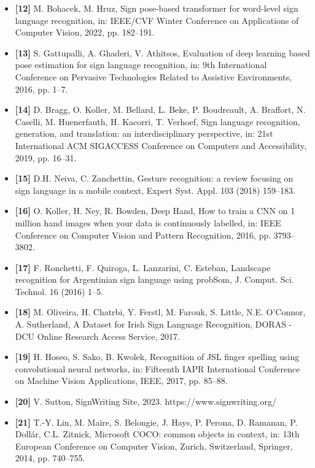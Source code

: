 \documentclass[12pt, a4paper]{article}
\begin{document}
\begin{itemize}[label=]
    \item \textbf{[12]} M. Bohacek, M. Hruz, Sign pose-based transformer for word-level sign language recognition, in: IEEE/CVF Winter Conference on Applications of Computer Vision, 2022, pp. 182–191.
    \item \textbf{[13]} S. Gattupalli, A. Ghaderi, V. Athitsos, Evaluation of deep learning based pose estimation for sign language recognition, in: 9th International Conference on Pervasive Technologies Related to Assistive Environments, 2016, pp. 1–7.
    \item \textbf{[14]} D. Bragg, O. Koller, M. Bellard, L. Beke, P. Boudreault, A. Braffort, N. Caselli, M. Huenerfauth, H. Kacorri, T. Verhoef, Sign language recognition, generation, and translation: an interdisciplinary perspective, in: 21st International ACM SIGACCESS Conference on Computers and Accessibility, 2019, pp. 16–31.
    \item \textbf{[15]} D.H. Neiva, C. Zanchettin, Gesture recognition: a review focusing on sign language in a mobile context, Expert Syst. Appl. 103 (2018) 159–183.
    \item \textbf{[16]} O. Koller, H. Ney, R. Bowden, Deep Hand, How to train a CNN on 1 million hand images when your data is continuously labelled, in: IEEE Conference on Computer Vision and Pattern Recognition, 2016, pp. 3793–3802.
    \item \textbf{[17]} F. Ronchetti, F. Quiroga, L. Lanzarini, C. Esteban, Landscape recognition for Argentinian sign language using probSom, J. Comput. Sci. Technol. 16 (2016) 1–5.
    \item \textbf{[18]} M. Oliveira, H. Chatrbi, Y. Ferstl, M. Farouk, S. Little, N.E. O’Connor, A. Sutherland, A Dataset for Irish Sign Language Recognition, DORAS - DCU Online Research Access Service, 2017.
    \item \textbf{[19]} H. Hoseo, S. Sako, B. Kwolek, Recognition of JSL finger spelling using convolutional neural networks, in: Fifteenth IAPR International Conference on Machine Vision Applications, IEEE, 2017, pp. 85–88.
    \item \textbf{[20]} V. Sutton, SignWriting Site, 2023. https://www.signwriting.org/
    \item \textbf{[21]} T.-Y. Lin, M. Maire, S. Belongie, J. Hays, P. Perona, D. Ramanan, P. Dollár, C.L. Zitnick, Microsoft COCO: common objects in context, in: 13th European Conference on Computer Vision, Zurich, Switzerland, Springer, 2014, pp. 740–755.
\end{itemize}
\end{document}
